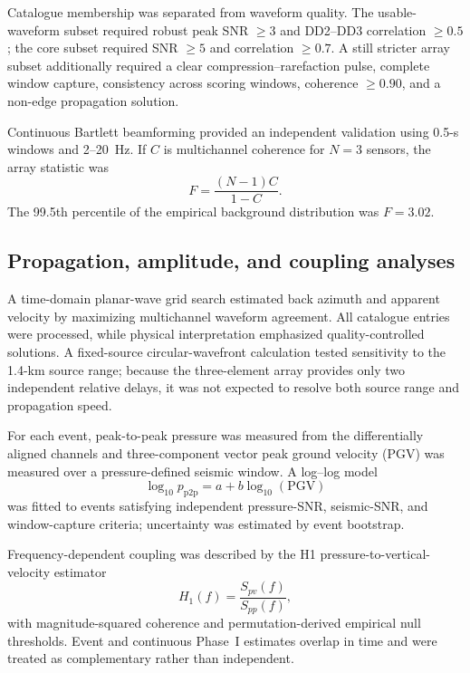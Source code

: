 \documentclass[]{seismica}
\begin{document}
Catalogue membership was separated from waveform quality. The
usable-waveform subset required robust peak SNR $\geq3$ and DD2--DD3
correlation $\geq0.5$; the core subset required SNR $\geq5$ and correlation
$\geq0.7$. A still stricter array subset additionally required a clear
compression--rarefaction pulse, complete window capture, consistency across
scoring windows, coherence $\geq0.90$, and a non-edge propagation solution.

Continuous Bartlett beamforming provided an independent validation using
0.5-s windows and 2--20~Hz. If $C$ is multichannel coherence for $N=3$
sensors, the array statistic was
\begin{equation}
 F=\frac{(N-1)C}{1-C}.
 \label{eq:f_statistic}
\end{equation}
The 99.5th percentile of the empirical background distribution was $F=3.02$.

\subsection{Propagation, amplitude, and coupling analyses}

A time-domain planar-wave grid search estimated back azimuth and apparent
velocity by maximizing multichannel waveform agreement. All catalogue entries
were processed, while physical interpretation emphasized quality-controlled
solutions. A fixed-source circular-wavefront calculation tested sensitivity to
the 1.4-km source range; because the three-element array provides only two
independent relative delays, it was not expected to resolve both source range
and propagation speed.

For each event, peak-to-peak pressure was measured from the differentially
aligned channels and three-component vector peak ground velocity (PGV) was
measured over a pressure-defined seismic window. A log--log model
\begin{equation}
 \log_{10}p_{\mathrm{p2p}}=a+b\log_{10}(\mathrm{PGV})
 \label{eq:power_law}
\end{equation}
was fitted to events satisfying independent pressure-SNR, seismic-SNR, and
window-capture criteria; uncertainty was estimated by event bootstrap.

Frequency-dependent coupling was described by the H1 pressure-to-vertical-
velocity estimator
\begin{equation}
 H_1(f)=\frac{S_{pv}(f)}{S_{pp}(f)},
 \label{eq:h1_transfer}
\end{equation}
with magnitude-squared coherence and permutation-derived empirical null
thresholds. Event and continuous Phase~I estimates overlap in time and were
treated as complementary rather than independent.
\end{document}
